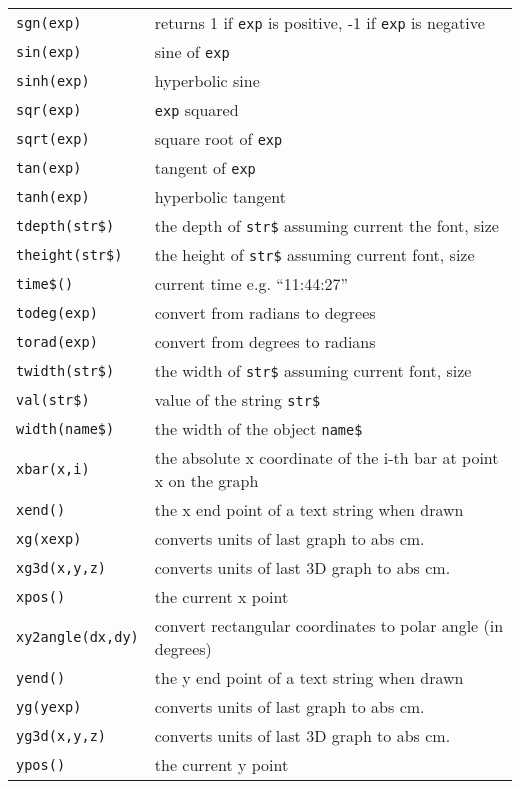 \begin{supertabular}{ll}
{\tt sgn(exp)}          	& returns 1 if {\tt exp} is positive, -1 if {\tt exp} is negative \\
{\tt sin(exp)}          	& sine of {\tt exp} \\
{\tt sinh(exp)}        	& hyperbolic sine \\
{\tt sqr(exp)}          	& {\tt exp} squared  \\
{\tt sqrt(exp)}        	& square root of {\tt exp} \\
{\tt tan(exp)}          	& tangent of {\tt exp} \\	 
{\tt tanh(exp)}        	& hyperbolic tangent \\
{\tt tdepth(str\$)}  	& the depth of {\tt str\$} assuming current the font, size \\
{\tt theight(str\$)}   & the height of {\tt str\$} assuming  current font, size \\
{\tt time\$()}       	& current time e.g. ``11:44:27'' \\
{\tt todeg(exp)}      	& convert from radians to degrees \\
{\tt torad(exp)}      	& convert from degrees to radians \\
{\tt twidth(str\$)}  	& the width of {\tt str\$} assuming current font, size \\
{\tt val(str\$)}        	& value of the string {\tt str\$} \\
{\tt width(name\$)}  	& the width of the object {\tt name\$} \\
{\tt xbar(x,i)}         	& the absolute x coordinate of the i-th bar at point x on the graph \\
{\tt xend()}           	& the x end point of a text string when drawn \\
{\tt xg(xexp)}              & converts units of last graph to abs cm. \\
{\tt xg3d(x,y,z)}         & converts units of last 3D graph to abs cm. \\
{\tt xpos()}           	& the current x point \\
{\tt xy2angle(dx,dy)} & convert rectangular coordinates to polar angle (in degrees)\\
{\tt yend()}           	& the y end point of a text string when drawn \\
{\tt yg(yexp)}              & converts units of last graph to abs cm. \\
{\tt yg3d(x,y,z)}         & converts units of last 3D graph to abs cm. \\
{\tt ypos()}           	& the current y point \\
\end{supertabular}

